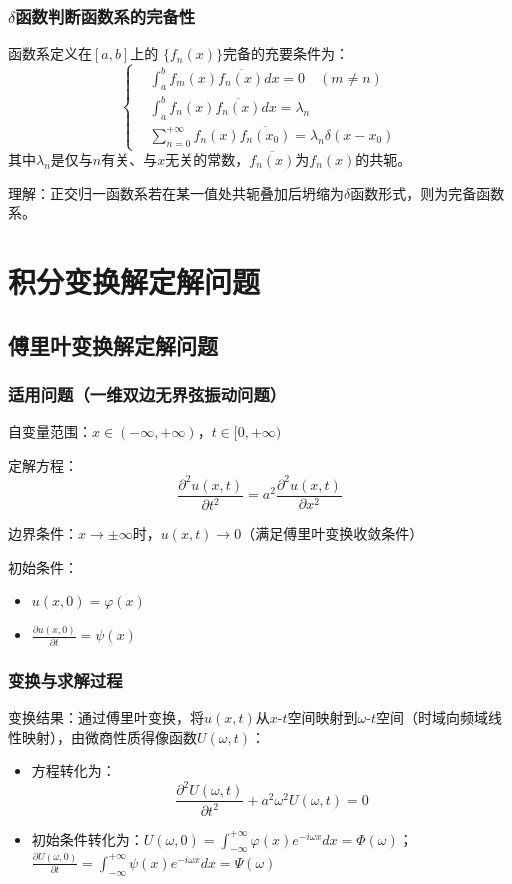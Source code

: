 \documentclass{article}
\begin{document}
	\subsubsection{$\delta$函数判断函数系的完备性}
	函数系定义在$[a,b]$上的 $\{f_n(x)\}$完备的充要条件为：
	\[
	\left\{
	\begin{aligned}
		&\int_{a}^{b}f_m(x)\overline{f_n(x)}dx = 0\quad(m\neq n) \\
		&\int_{a}^{b}f_n(x)\overline{f_n(x)}dx = \lambda_n \\
		&\sum_{n = 0}^{+\infty}f_n(x)\overline{f_n(x_0)} = \lambda_n\delta(x - x_0)
	\end{aligned}
	\right.
	\]
	其中$\lambda_n$是仅与$n$有关、与$x$无关的常数，$\overline{f_n(x)}$为$f_n(x)$的共轭。
	
	理解：正交归一函数系若在某一值处共轭叠加后坍缩为$\delta$函数形式，则为完备函数系。
	
		
	\section{积分变换解定解问题}
	
	\subsection{傅里叶变换解定解问题}
	
	\subsubsection{适用问题（一维双边无界弦振动问题）}
	自变量范围：\(x \in (-\infty,+\infty)\)，\(t \in [0,+\infty)\)
	
	定解方程：
	\[
	\frac{\partial^2 u(x,t)}{\partial t^2} = a^2 \frac{\partial^2 u(x,t)}{\partial x^2}
	\]
	
	边界条件：\(x \to \pm\infty\)时，\(u(x,t) \to 0\)（满足傅里叶变换收敛条件）
	
	初始条件：
	\begin{itemize}
		\item \(u(x,0) = \varphi(x)\)
		\item \(\frac{\partial u(x,0)}{\partial t} = \psi(x)\)
	\end{itemize}
	
	\subsubsection{变换与求解过程}
	变换结果：通过傅里叶变换，将\(u(x,t)\)从\(x\text{-}t\)空间映射到\(\omega\text{-}t\)空间（时域向频域线性映射），由微商性质得像函数\(U(\omega,t)\)：
	\begin{itemize}
		\item 方程转化为：
		\[
		\frac{\partial^2 U(\omega,t)}{\partial t^2} + a^2 \omega^2 U(\omega,t) = 0
		\]
		\item 初始条件转化为：\(U(\omega,0) = \int_{-\infty}^{+\infty} \varphi(x) e^{-i\omega x} dx = \Phi(\omega)\)；\(\frac{\partial U(\omega,0)}{\partial t} = \int_{-\infty}^{+\infty} \psi(x) e^{-i\omega x} dx = \Psi(\omega)\)
	\end{itemize}
	
\end{document}
